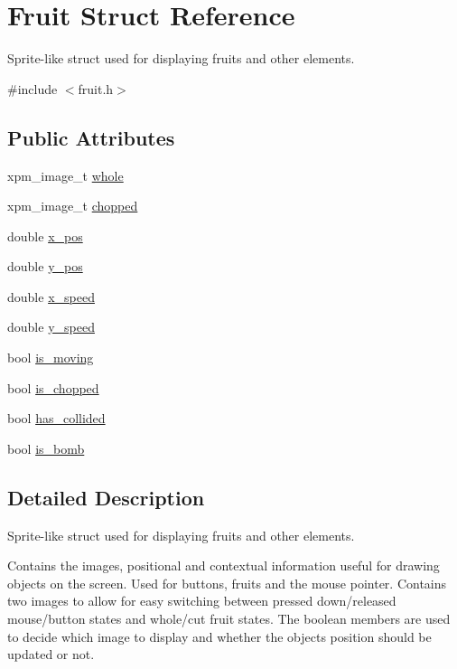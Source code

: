 \hypertarget{structFruit}{}\section{Fruit Struct Reference}
\label{structFruit}


Sprite-\/like struct used for displaying fruits and other elements.  




{\ttfamily \#include $<$fruit.\+h$>$}

\subsection*{Public Attributes}
\begin{DoxyCompactItemize}
\item 
xpm\+\_\+image\+\_\+t \hyperlink{structFruit_af2d21891aa444872c85b5477b063b0ff}{whole}
\item 
xpm\+\_\+image\+\_\+t \hyperlink{structFruit_aa5354964e7b2d36d50ec862395131f28}{chopped}
\item 
double \hyperlink{structFruit_a1b9c77d333911293a2c7ae9417608b40}{x\+\_\+pos}
\item 
double \hyperlink{structFruit_a569ebecee6a70958b552463a89e106ba}{y\+\_\+pos}
\item 
double \hyperlink{structFruit_a581a41a384b918c8c18116afc954d398}{x\+\_\+speed}
\item 
double \hyperlink{structFruit_a8e2b3a76e886f184b4845a2629f925b8}{y\+\_\+speed}
\item 
bool \hyperlink{structFruit_a17e2ee1928c9adf7aa06b9f82811b5a3}{is\+\_\+moving}
\item 
bool \hyperlink{structFruit_a1847b2662bc2eb7a8f427b69a4346fa7}{is\+\_\+chopped}
\item 
bool \hyperlink{structFruit_a8fb85e06a75c3455fd53cc7fa9243ce7}{has\+\_\+collided}
\item 
bool \hyperlink{structFruit_a4efa820e5e590d6f16062993452b7210}{is\+\_\+bomb}
\end{DoxyCompactItemize}


\subsection{Detailed Description}
Sprite-\/like struct used for displaying fruits and other elements. 

Contains the images, positional and contextual information useful for drawing objects on the screen. Used for buttons, fruits and the mouse pointer. Contains two images to allow for easy switching between pressed down/released mouse/button states and whole/cut fruit states. The boolean members are used to decide which image to display and whether the object\textquotesingle{}s position should be updated or not. 

